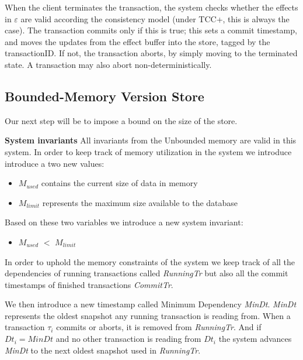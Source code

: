 \documentclass[systeme,french,english]{compas2022}
\newcommand{\commentaire}[2][fromWhom?]{%
  {%
    \color{magenta}{\bfseries\sffamily\scriptsize$\triangleright$(#1:) #2$\triangleleft$}%
  }}
\begin{document}
When the client terminates the transaction, the system checks whether
the effects in $\varepsilon$ are valid according the consistency model
(under TCC+, this is always the case).
The transaction commits only if this is true; this sets a commit
timestamp, and moves the updates
from the effect buffer into the store, tagged by the transactionID.
If not, the transaction aborts, by simply moving to the terminated
state.
A transaction may also abort non-deterministically.

\subsection{Bounded-Memory Version Store}

Our next step will be to impose a bound on the size of the store.

\commentaire[Marc]{Stopped here **** 2022-04-16 10:40}

\textbf{System invariants}
All invariants from the Unbounded memory are valid in this system.
In order to keep track of memory utilization in the system we introduce introduce a two new values:
\begin{itemize}
  \item \emph{$M_{used}$} contains the current size of data in memory
  \item \emph{$M_{limit}$} represents the maximum size available to the database
\end{itemize}
Based on these two variables we introduce a new system invariant:
\begin{itemize}
  \item \emph{$M_{used}$} $<$ \emph{$M_{limit}$}
\end{itemize}
In order to uphold the memory constraints of the system we keep track of all the dependencies of running transactions called \emph{RunningTr} but also all the commit timestamps of finished transactions \emph{CommitTr}.

We then introduce a new timestamp called Minimum Dependency \emph{MinDt}.
\emph{MinDt} represents the oldest snapshot any running transaction is reading from.
When a transaction $\tau_i$ commits or aborts, it is removed from \emph{RunningTr}. 
And if $Dt_i = MinDt$ and no other transaction is reading from $Dt_i$ the system advances \emph{MinDt} to the next oldest snapshot used in \emph{RunningTr}.
\end{document}

